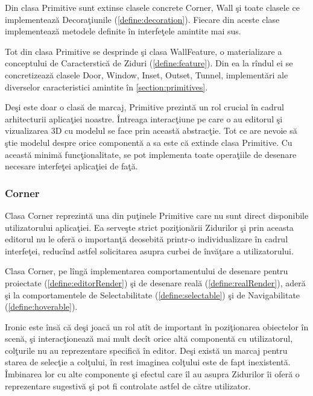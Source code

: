 Din clasa Primitive sunt extinse clasele concrete Corner, Wall şi
toate clasele ce implementează Decoraţiunile (\ref{define:decoration}). Fiecare
din aceste clase implementează metodele definite în interfeţele amintite mai
sus.

Tot din clasa Primitive se desprinde şi clasa WallFeature, o materializare a
conceptului de Caracterstică de Ziduri (\ref{define:feature}). Din ea la rîndul
ei se concretizează clasele Door, Window, Inset, Outset, Tunnel, implementări
ale diverselor caracteristici amintite în \ref{section:primitives}.

Deşi este doar o clasă de marcaj, Primitive prezintă un rol crucial în cadrul
arhitecturii aplicaţiei noastre. Întreaga interacţiune pe care o au editorul şi
vizualizarea 3D cu modelul se face prin această abstracţie. Tot ce are nevoie să
ştie modelul despre orice componentă a sa este că extinde clasa Primitive. Cu
această minimă funcţionalitate, se pot implementa toate operaţiile de desenare
necesare interfeţei aplicaţiei de faţă.

\subsubsection{Corner}

Clasa Corner reprezintă una din puţinele Primitive care nu sunt direct
disponibile utilizatorului aplicaţiei. Ea serveşte strict poziţionării Zidurilor
şi prin aceasta editorul nu le oferă o importanţă deosebită printr-o
individualizare în cadrul interfeţei, reducînd astfel solicitarea asupra curbei
de învăţare a utilizatorului.

Clasa Corner, pe lîngă implementarea comportamentului de desenare pentru
proiectate (\ref{define:editorRender}) şi de desenare reală
(\ref{define:realRender}), aderă şi la comportamentele de Selectabilitate
(\ref{define:selectable}) şi de Navigabilitate (\ref{define:hoverable}).

Ironic este însă că deşi joacă un rol atît de important în poziţionarea 
obiectelor în scenă, şi interacţionează mai mult decît orice altă componentă cu 
utilizatorul, colţurile nu au reprezentare specifică în editor. Deşi există un 
marcaj pentru starea de selecţie a colţului, în rest imaginea colţului este de 
fapt inexistentă. Îmbinarea lor cu alte componente şi efectul care îl au asupra 
Zidurilor îi oferă o reprezentare sugestivă şi pot fi controlate astfel de 
către utilizator.